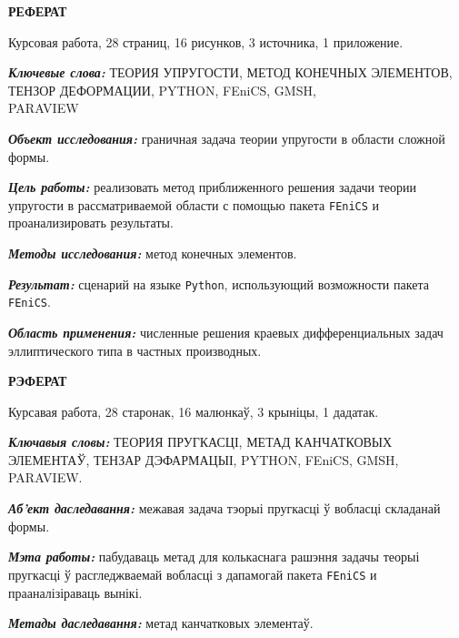 \documentclass[a4paper, 14pt]{extreport}
\begin{document}
\renewcommand{\figurename}{Рисунок} %
\renewcommand{\contentsname}{\hfill\Large ОГЛАВЛЕНИЕ \hfill}
\renewcommand{\cftaftertoctitle}{\hfill}


\tableofcontents



\newpage
{}
\begin{center}
	\Large{\textbf{РЕФЕРАТ}}
\end{center}

Курсовая работа, 28 страниц, 16 рисунков, 3 источника, 1 приложение.

\textbf{\textit{Ключевые слова:}} ТЕОРИЯ УПРУГОСТИ, МЕТОД КОНЕЧНЫХ 
ЭЛЕМЕНТОВ, ТЕНЗОР ДЕФОРМАЦИИ, PYTHON, FEniCS, 
GMSH, \\ PARAVIEW

\textbf{\textit{Объект исследования:}} граничная задача теории 
упругости в области сложной формы.

\textbf{\textit{Цель работы:}} реализовать метод приближенного решения
задачи теории упругости в рассматриваемой области с помощью пакета
\texttt{FEniCS} и проанализировать результаты.

\textbf{\textit{Методы исследования:}} метод конечных элементов.

\textbf{\textit{Результат:}} сценарий на языке \texttt{Python},
использующий возможности пакета \texttt{FEniCS}.

\textbf{\textit{Область применения:}} численные решения краевых 
дифференциальных задач эллиптического типа в частных производных.

\begin{center}
	\Large{\textbf{РЭФЕРАТ}}
\end{center}

Курсавая работа, 28 старонак, 16 малюнкаў, 3 крыніцы, 1 дадатак.

\textbf{\textit{Ключавыя словы:}} ТЕОРИЯ ПРУГКАСЦІ, МЕТАД КАНЧАТКОВЫХ \\
ЭЛЕМЕНТАЎ, ТЕНЗАР ДЭФАРМАЦЫІ, PYTHON, FEniCS, 
GMSH, \\
PARAVIEW.

\textbf{\textit{Аб'ект даследавання:}} межавая задача тэорыі 
пругкасці ў вобласці складанай формы.

\textbf{\textit{Мэта работы:}} пабудаваць метад для колькаснага 
рашэння задачы теорыі пругкасці ў расгледжваемай вобласці з
дапамогай пакета \texttt{FEniCS} и прааналізіраваць вынікі.

\textbf{\textit{Метады даследавання:}} метад канчатковых элементаў.
\end{document}
